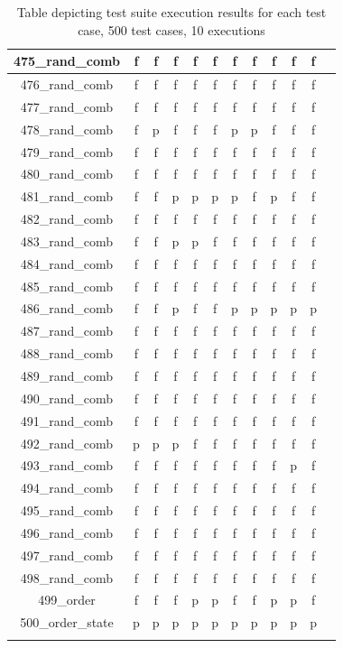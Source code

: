 \documentclass[
fancyheadings, %
%
%
]{stsreprt}
\begin{document}
\begin{longtable}{|c|c|c|c|c|c|c|c|c|c|c|c|}
\hline
475\_rand\_comb  & f & f & f & f & f & f & f & f & f & f \\
\hline
476\_rand\_comb  & f & f & f & f & f & f & f & f & f & f \\
\hline
477\_rand\_comb  & f & f & f & f & f & f & f & f & f & f \\
\hline
478\_rand\_comb & f & p & f & f & f & p & p & f & f & f \\
\hline
479\_rand\_comb  & f & f & f & f & f & f & f & f & f & f \\
\hline
480\_rand\_comb  & f & f & f & f & f & f & f & f & f & f \\
\hline
481\_rand\_comb & f & f & p & p & p & p & f & p & f & f \\
\hline
482\_rand\_comb  & f & f & f & f & f & f & f & f & f & f \\
\hline
483\_rand\_comb & f & f & p & p & f & f & f & f & f & f \\
\hline
484\_rand\_comb  & f & f & f & f & f & f & f & f & f & f \\
\hline
485\_rand\_comb  & f & f & f & f & f & f & f & f & f & f \\
\hline
486\_rand\_comb & f & f & p & f & f & p & p & p & p & p \\
\hline
487\_rand\_comb  & f & f & f & f & f & f & f & f & f & f \\
\hline
488\_rand\_comb  & f & f & f & f & f & f & f & f & f & f \\
\hline
489\_rand\_comb  & f & f & f & f & f & f & f & f & f & f \\
\hline
490\_rand\_comb  & f & f & f & f & f & f & f & f & f & f \\
\hline
491\_rand\_comb  & f & f & f & f & f & f & f & f & f & f \\
\hline
492\_rand\_comb & p & p & p & f & f & f & f & f & f & f \\
\hline
493\_rand\_comb & f & f & f & f & f & f & f & f & p & f \\
\hline
494\_rand\_comb  & f & f & f & f & f & f & f & f & f & f \\
\hline
495\_rand\_comb  & f & f & f & f & f & f & f & f & f & f \\
\hline
496\_rand\_comb  & f & f & f & f & f & f & f & f & f & f \\
\hline
497\_rand\_comb  & f & f & f & f & f & f & f & f & f & f \\
\hline
498\_rand\_comb  & f & f & f & f & f & f & f & f & f & f \\
\hline
499\_order & f & f & f & p & p & f & f & p & p & f \\
\hline
500\_order\_state & p & p & p & p & p & p & p & p & p & p \\
\hline
\caption{Table depicting test suite execution results for each test case, 500 test cases, 10 executions}
\label{table:exec-res}
\end{longtable}

\backmatter


\end{document}
